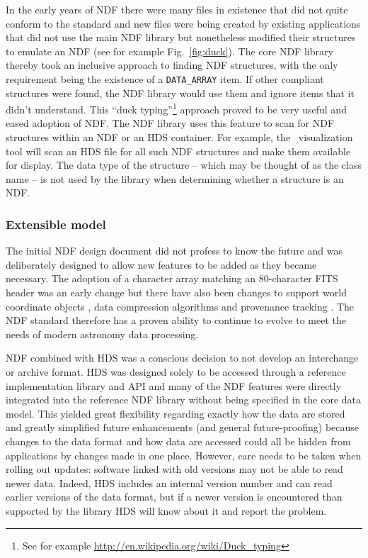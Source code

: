 \documentclass[final,authoryear,5p,times,twocolumn]{elsarticle}
\begin{document}
In the early years of NDF there were many files in existence that did
not quite conform to the standard and new files were being created by
existing applications that did not use the main NDF library but
nonetheless modified their structures to emulate an NDF (see for
example Fig.\ \ref{fig:duck}). The core NDF library thereby took an
inclusive approach to finding NDF structures, with the only requirement
being the existence of a \texttt{DATA\_ARRAY} item. If other compliant
structures were found, the NDF library would use them and ignore items
that it didn't understand. This ``duck typing''\footnote{See for
  example \url{http://en.wikipedia.org/wiki/Duck_typing}} approach
proved to be very useful and eased adoption of NDF. The NDF
library uses this feature to scan for NDF structures within an NDF or
an HDS container. For example, the \gaia\ visualization tool \citep[][]{2009ASPC..411..575D}
will scan an HDS file for all such NDF structures and make them
available for display. The data type of the structure -- which may be
thought of as the class name -- is not used by the library when
determining whether a structure is an NDF.

\subsubsection{Extensible model}

The initial NDF design document did not profess to know the future and
was deliberately designed to allow new features to be added as they
became necessary. The adoption of a character array matching an
80-character FITS header was an early change but there have also been
changes to support world coordinate objects
\citep{2001ASPC..238..129B}, data compression algorithms
\citep{2008ASPC..394..650C} and provenance tracking
\citep{2009ASPC..411..418J}. The NDF standard therefore has a proven
ability to continue to evolve
to meet the needs of modern astronomy data processing.

NDF combined with HDS was a conscious decision to not develop an
interchange or archive format. HDS was designed solely to be accessed
through a reference implementation library and API and many of the NDF
features were directly integrated into the reference NDF library without being
specified in the core data model.  This yielded great flexibility
regarding exactly how the data are stored and greatly simplified
future enhancements (and general future-proofing) because changes to
the data format and how data are accessed could all be hidden from
applications by changes made in one place. However, care needs to be taken
when rolling out updates: software linked with old versions
may not be able to read newer data. Indeed, HDS includes an internal
version number and can read earlier versions of the data format, but if a
newer version is encountered than supported by the library HDS will
know about it and report the problem.
\end{document}
